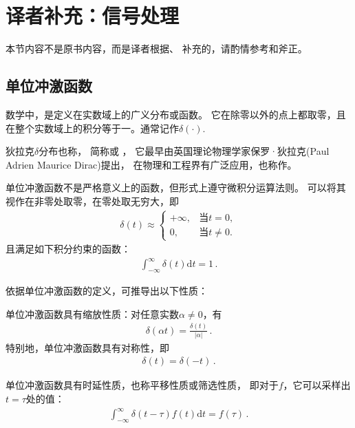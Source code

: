 \section{译者补充：信号处理}\label{sec:译者补充：信号处理}
\begin{remark}
    本节内容不是原书内容，而是译者根据\citet{DigitalSignalProcessing}、
    \citet{enwiki:1115652231}补充的，请酌情参考和斧正。
\end{remark}

\subsection{单位冲激函数}\label{sub:单位冲激函数}
\begin{definition}
    数学中，是定义在实数域上的广义分布或函数。
    它在除零以外的点上都取零，且在整个实数域上的积分等于一。通常记作$\delta(\cdot)$.
\end{definition}

狄拉克$\delta$分布也称，
简称或
，
它最早由英国理论物理学家保罗·狄拉克(Paul Adrien Maurice Dirac)提出，
在物理和工程界有广泛应用，也称作。

单位冲激函数不是严格意义上的函数，但形式上遵守微积分运算法则。
可以将其视作在非零处取零，在零处取无穷大，即
\begin{align}
    \delta(t)\approx\left\{
    \begin{array}{ll}
        +\infty, & \text{当}t=0,     \\
        0,       & \text{当}t\neq 0.
    \end{array}
    \right.
\end{align}
且满足如下积分约束的函数：
\begin{align}
    \int_{-\infty}^{\infty}\delta(t)\mathrm{d}t=1\, .
\end{align}

依据单位冲激函数的定义，可推导出以下性质：
\begin{theorem}
    单位冲激函数具有缩放性质：对任意实数$\alpha\neq0$，有
    \begin{align}
        \delta(\alpha t)=\frac{\delta(t)}{|\alpha|}\, .
    \end{align}
    特别地，单位冲激函数具有对称性，即
    \begin{align}
        \delta(t)=\delta(-t)\, .
    \end{align}
\end{theorem}
\begin{theorem}
    单位冲激函数具有时延性质，也称平移性质或筛选性质，
    即对于$f$，它可以采样出$t=\tau$处的值：
    \begin{align}
        \int_{-\infty}^{\infty}\delta(t-\tau)f(t)\mathrm{d}t=f(\tau)\, .
    \end{align}
\end{theorem}
